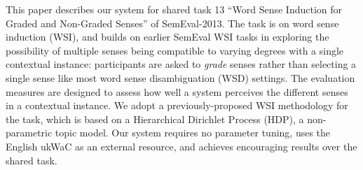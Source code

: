 This paper describes our system for shared task 13 ``Word Sense Induction for Graded and Non-Graded Senses'' of SemEval-2013. The task
 is on word sense induction (WSI), and builds on earlier SemEval WSI
 tasks in exploring the possibility of multiple senses being compatible
 to varying degrees with a single contextual instance: participants are
 asked to \textit{grade} senses rather than selecting a single sense
 like most word sense disambiguation (WSD) settings. The evaluation
 measures are designed to assess how well a system perceives the
 different senses in a contextual instance. We adopt a
 previously-proposed WSI methodology for the task, which is based on a
 Hierarchical Dirichlet Process (HDP), a non-parametric topic model.
 Our system requires no parameter tuning, uses the English ukWaC as an
 external resource, and achieves encouraging results over the shared
 task.

